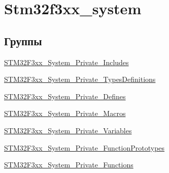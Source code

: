 \hypertarget{group__stm32f3xx__system}{
\section{Stm32f3xx\_\-system}
\label{group__stm32f3xx__system}
}
\subsection*{Группы}
\begin{CompactItemize}
\item 
\hyperlink{group___s_t_m32_f3xx___system___private___includes}{STM32F3xx\_\-System\_\-Private\_\-Includes}
\item 
\hyperlink{group___s_t_m32_f3xx___system___private___types_definitions}{STM32F3xx\_\-System\_\-Private\_\-TypesDefinitions}
\item 
\hyperlink{group___s_t_m32_f3xx___system___private___defines}{STM32F3xx\_\-System\_\-Private\_\-Defines}
\item 
\hyperlink{group___s_t_m32_f3xx___system___private___macros}{STM32F3xx\_\-System\_\-Private\_\-Macros}
\item 
\hyperlink{group___s_t_m32_f3xx___system___private___variables}{STM32F3xx\_\-System\_\-Private\_\-Variables}
\item 
\hyperlink{group___s_t_m32_f3xx___system___private___function_prototypes}{STM32F3xx\_\-System\_\-Private\_\-FunctionPrototypes}
\item 
\hyperlink{group___s_t_m32_f3xx___system___private___functions}{STM32F3xx\_\-System\_\-Private\_\-Functions}
\end{CompactItemize}
